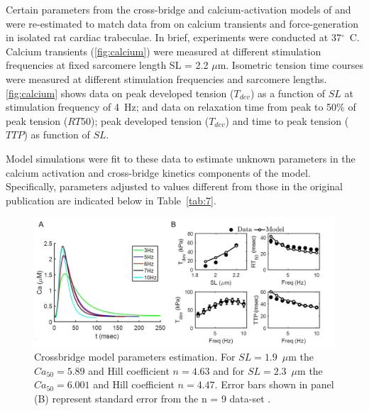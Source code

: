 \documentclass[fleqn,10pt]{physiome}
\begin{document}
Certain parameters from the cross-bridge and calcium-activation models of \cite{Tewari2016a,Tewari2016b} and \cite{Campbell2018} were re-estimated to match data from \cite{Janssen2002} on calcium transients and force-generation in isolated rat cardiac trabeculae. In brief, experiments were conducted at 37$^\circ$~C. Calcium transients (\autoref{fig:calcium}) were measured at different stimulation frequencies at fixed sarcomere length SL = 2.2 $\mu$m. Isometric tension time courses were measured at different stimulation frequencies and sarcomere lengths. \autoref{fig:calcium} shows data on peak developed tension ($T_{dev}$) as a function of $SL$ at stimulation frequency of 4~Hz; and data on relaxation time from peak to 50\% of peak tension ($RT50$); peak developed tension ($T_{dev}$) and time to peak tension ($TTP$) as function of $SL$.

Model simulations were fit to these data to estimate unknown parameters in the calcium activation and cross-bridge kinetics components of the model. Specifically, parameters adjusted to values different from those in the original publication are indicated below in Table~\ref{tab:7}.

\begin{figure}[ht]\centering
\includegraphics[width=1.0\linewidth]{CrossBridgeParaEstimate.jpg}
\caption{Crossbridge model parameters estimation. For $SL =1.9$~$\mu$m the $Ca_{50} = 5.89$ and Hill coefficient $n = 4.63$ and for $SL = 2.3$~$\mu$m the $Ca_{50} =6.001$ and Hill coefficient $n = 4.47$. Error bars shown in panel (B) represent standard error from the n = 9 data-set \citep{Janssen2002}.}
\label{fig:calcium}
\end{figure}
\end{document}
